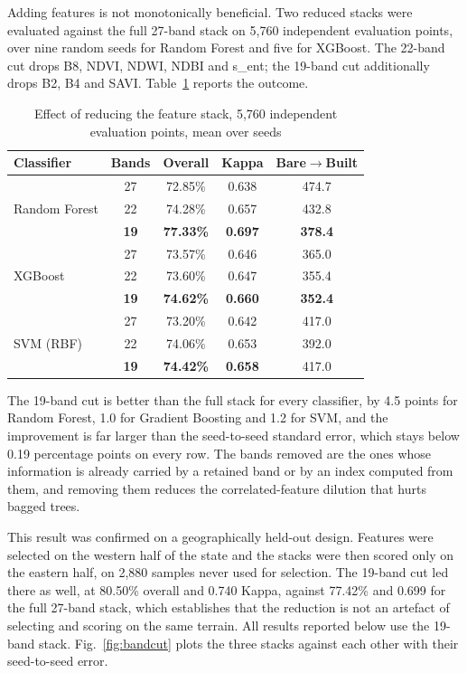 \documentclass[conference]{IEEEtran}
\begin{document}
Adding features is not monotonically beneficial. Two reduced stacks were
evaluated against the full 27-band stack on 5{,}760 independent
evaluation points, over nine random seeds for Random Forest and five for
XGBoost. The 22-band cut drops B8, NDVI, NDWI, NDBI and s\_ent; the
19-band cut additionally drops B2, B4 and SAVI.
Table~\ref{tab:bandcut} reports the outcome.

\begin{table}[!t]
\caption{Effect of reducing the feature stack, 5{,}760 independent
evaluation points, mean over seeds}
\label{tab:bandcut}
\centering
\footnotesize
\begin{tabular}{@{}lcccc@{}}
\toprule
\textbf{Classifier} & \textbf{Bands} & \textbf{Overall} &
\textbf{Kappa} & \textbf{Bare$\rightarrow$Built} \\
\midrule
\multirow{3}{*}{Random Forest}
 & 27 & 72.85\% & 0.638 & 474.7 \\
 & 22 & 74.28\% & 0.657 & 432.8 \\
 & \textbf{19} & \textbf{77.33\%} & \textbf{0.697} & \textbf{378.4} \\
\midrule
\multirow{3}{*}{XGBoost}
 & 27 & 73.57\% & 0.646 & 365.0 \\
 & 22 & 73.60\% & 0.647 & 355.4 \\
 & \textbf{19} & \textbf{74.62\%} & \textbf{0.660} & \textbf{352.4} \\
\midrule
\multirow{3}{*}{SVM (RBF)}
 & 27 & 73.20\% & 0.642 & 417.0 \\
 & 22 & 74.06\% & 0.653 & 392.0 \\
 & \textbf{19} & \textbf{74.42\%} & \textbf{0.658} & 417.0 \\
\bottomrule
\end{tabular}
\end{table}

The 19-band cut is better than the full stack for every classifier, by
4.5 points for Random Forest, 1.0 for Gradient Boosting and 1.2 for SVM,
and the improvement is far larger than the seed-to-seed standard error,
which stays below 0.19 percentage points on every row. The bands removed are the ones
whose information is already carried by a retained band or by an index
computed from them, and removing them reduces the correlated-feature
dilution that hurts bagged trees.

This result was confirmed on a geographically held-out design. Features
were selected on the western half of the state and the stacks were then
scored only on the eastern half, on 2{,}880 samples never used for
selection. The 19-band cut led there as well, at 80.50\% overall and
0.740 Kappa, against 77.42\% and 0.699 for the full 27-band stack, which
establishes that the reduction is not an artefact of selecting and
scoring on the same terrain. All results reported below use the 19-band
stack. Fig.~\ref{fig:bandcut} plots the three stacks against each other
with their seed-to-seed error.
\end{document}
